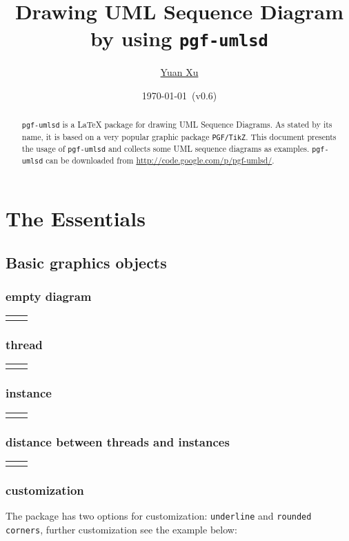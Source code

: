 \documentclass{article}
\newcommand{\demo}[2][1]{
  \begin{center}
  \begin{tabular}{cc}
    \begin{minipage}{.49\linewidth}
      \centering
      \resizebox{#1\linewidth}{!}{
        
      }
    \end{minipage}
    &
    \begin{minipage}{.45\linewidth}
      
    \end{minipage}
  \end{tabular}
  \end{center}
}
\begin{document}
\title{Drawing UML Sequence Diagram by using \texttt{pgf-umlsd}}
\author{\href{mailto:xuyuan.cn@gmail.com}{Yuan Xu}}
\date{\today{}~(v0.6)}
\maketitle

\begin{abstract}
  \texttt{pgf-umlsd} is a LaTeX package for drawing UML Sequence
  Diagrams. As stated by its name, it is based on a very popular
  graphic package \texttt{PGF/TikZ}. This document presents the usage
  of \texttt{pgf-umlsd} and collects some UML sequence diagrams as
  examples. \texttt{pgf-umlsd} can be downloaded from
  \href{http://code.google.com/p/pgf-umlsd/}{http://code.google.com/p/pgf-umlsd/}.
\end{abstract}

\tableofcontents

\section{The Essentials}
\subsection{Basic graphics objects}
\subsubsection{empty diagram}
\demo{empty}

\subsubsection{thread}
\demo[0.3]{thread}

\subsubsection{instance}
\demo[0.3]{instance}

\subsubsection{distance between threads and instances}
\demo{distance}

\subsubsection{customization}
The package has two options for customization: \texttt{underline} and
\texttt{rounded corners}, further customization see the example below:
\end{document}
